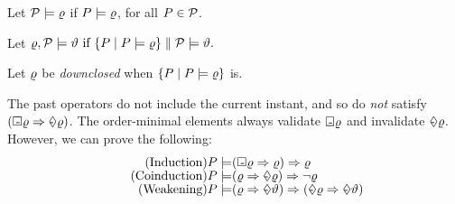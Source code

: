   Let $\mathcal{P}\models \varrho$
  if $P \models\varrho$, for all $P \in \mathcal{P}$.
  
Let
  \begin{math}
    \varrho, \mathcal{P} \models \vartheta  \text{ if } \{ P \mid P \models \varrho \} \parallel \mathcal{P} \models \vartheta.
  \end{math}

  Let $\varrho$ be \emph{downclosed} when
  $\{ P \mid P \models \varrho \}$ is.


  The past operators do not include the current instant, and so
  do \emph{not} satisfy
  $(\Box\mkern-8.8mu\text{-}\mkern3mu\varrho\Rightarrow\Diamond\mkern-10.1mu\text{-}\mkern4mu\varrho)$. The order-minimal elements always validate
    $\Box\mkern-8.8mu\text{-}\mkern3mu\varrho$ and invalidate
    $\Diamond\mkern-10.1mu\text{-}\mkern4mu\varrho$.
  However, we can prove the following:
\begin{align*}
  \tag{Induction}
  \aPS \models& (\always\afo \Rightarrow\afo) \Rightarrow\afo
  \\[-1ex]
  \tag{Coinduction}
  \aPS \models& (\afo \Rightarrow\once{\afo}) \Rightarrow\lnot \afo
  \\[-1ex]
  \tag{Weakening}
  \aPS \models& (\afo \Rightarrow\once{\bfo}) \Rightarrow (\once\afo \Rightarrow\once{\bfo})
\end{align*}

